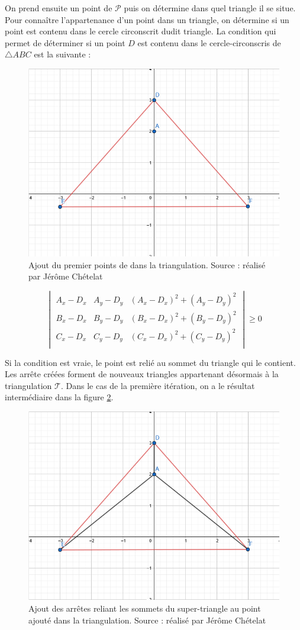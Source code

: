 On prend ensuite un point de $\mathcal{P}$ puis on détermine dans quel triangle il se situe.
Pour connaître l'appartenance d'un point dans un triangle, on détermine si un point est contenu dans le cercle circonscrit dudit triangle.
La condition qui permet de déterminer si un point $D$ est contenu dans le cercle-circonscris de $\triangle ABC$ est la suivante :

\begin{figure}[htbp!]
    \centering
    \includegraphics[width=0.66\linewidth]{figures/bowyer-watson/step_4.png}
    \caption{Ajout du premier points de dans la triangulation. Source : réalisé par
	Jérôme Chételat}
	\label{fig:triangulation_step_4}
\end{figure}

$$
\begin{vmatrix}
 A_x - D_x & A_y - D_y & (A_x - D_x)^2 + (A_y - D_y)^2 \\
 B_x - D_x & B_y - D_y & (B_x - D_x)^2 + (B_y - D_y)^2 \\
 C_x - D_x & C_y - D_y & (C_x - D_x)^2 + (C_y - D_y)^2 \\
\end{vmatrix} \geqslant 0
$$

Si la condition est vraie, le point est relié au sommet du triangle qui le contient.
Les arrête créées forment de nouveaux triangles appartenant désormais à la
triangulation $\mathcal{T}$. Dans le cas de la première itération, on a le
résultat intermédiaire dans la figure \ref{fig:triangulation_step_5}.

\begin{figure}[htbp!]
    \centering
    \includegraphics[width=0.66\linewidth]{figures/bowyer-watson/step_5.png}
    \caption{Ajout des arrêtes reliant les sommets du super-triangle au point
		ajouté dans la triangulation. Source : réalisé par
	Jérôme Chételat}
	\label{fig:triangulation_step_5}
\end{figure}

